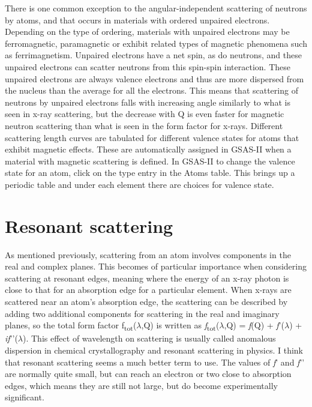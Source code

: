 There is one common exception to the angular-independent scattering of neutrons by atoms, and that occurs in materials with ordered unpaired electrons. Depending on the type of ordering, materials with unpaired electrons may be ferromagnetic, paramagnetic or exhibit related types of magnetic phenomena such as ferrimagnetism. Unpaired electrons have a net spin, as do neutrons, and these unpaired electrons can scatter neutrons from this spin-spin interaction. These unpaired electrons are always valence electrons and thus are more dispersed from the nucleus than the average for all the electrons. This means that scattering of neutrons by unpaired electrons falls with increasing angle similarly to what is seen in x-ray scattering, but the decrease with Q is even faster for magnetic neutron scattering than what is seen in the form factor for x-rays. Different scattering length curves are tabulated for different valence states for atoms that exhibit magnetic effects. These are automatically assigned in GSAS-II when a material with magnetic scattering is defined. 
In GSAS-II to change the valence state for an atom, click on the type entry in the Atoms table. This brings up a periodic table and under each element there are choices for valence state.

\section{Resonant scattering}

As mentioned previously, scattering from an atom involves components in the real and complex planes. This becomes of particular importance when considering scattering at resonant edges, meaning where the energy of an x-ray photon is close to that for an absorption edge for a particular element. When x-rays are scattered near an atom’s absorption edge, the scattering can be described by adding two additional components for scattering in the real and imaginary planes, so the total form factor f\textsubscript{tot}($\lambda$,Q) is written as \textit{f}\textsubscript{tot}($\lambda$,Q) = \textit{f}(Q) + \textit{f}’($\lambda$) + \textit{i}\textit{f}’’($\lambda$). This effect of wavelength on scattering is usually called anomalous dispersion in chemical crystallography and resonant scattering in physics.\label{ref:resonantscattering} I think that resonant scattering seems a much better term to use. The values of \textit{f}’ and \textit{f}’’ are normally quite small, but can reach an electron or two close to absorption edges, which means they are still not large, but do become experimentally significant. 

